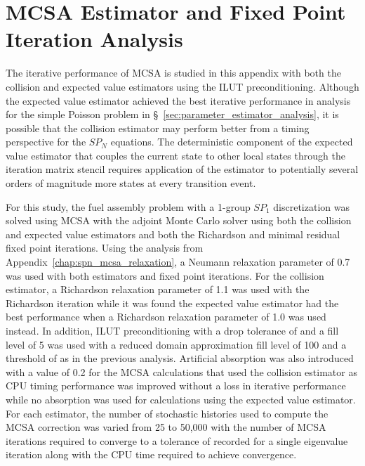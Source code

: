 \chapter{MCSA Estimator and Fixed Point\\ Iteration Analysis\ }
\label{chap:spn_estimator_comparison}
The iterative performance of MCSA is studied in this appendix with
both the collision and expected value estimators using the ILUT
preconditioning. Although the expected value estimator achieved the
best iterative performance in analysis for the simple Poisson problem
in \S~\ref{sec:parameter_estimator_analysis}, it is possible that the
collision estimator may perform better from a timing perspective for
the $SP_N$ equations. The deterministic component of the expected
value estimator that couples the current state to other local states
through the iteration matrix stencil requires application of the
estimator to potentially several orders of magnitude more states at
every transition event.

For this study, the fuel assembly problem with a 1-group $SP_1$
discretization was solved using MCSA with the adjoint Monte Carlo
solver using both the collision and expected value estimators and both
the Richardson and minimal residual fixed point iterations. Using the
analysis from Appendix~\ref{chap:spn_mcsa_relaxation}, a Neumann
relaxation parameter of 0.7 was used with both estimators and fixed
point iterations. For the collision estimator, a Richardson relaxation
parameter of 1.1 was used with the Richardson iteration while it was
found the expected value estimator had the best performance when a
Richardson relaxation parameter of 1.0 was used instead. In addition,
ILUT preconditioning with a drop tolerance of  and a fill
level of 5 was used with a reduced domain approximation fill level of
100 and a threshold of  as in the previous
analysis. Artificial absorption was also introduced with a value of
0.2 for the MCSA calculations that used the collision estimator as CPU
timing performance was improved without a loss in iterative
performance while no absorption was used for calculations using the
expected value estimator. For each estimator, the number of stochastic
histories used to compute the MCSA correction was varied from 25 to
50,000 with the number of MCSA iterations required to converge to a
tolerance of  recorded for a single eigenvalue iteration
along with the CPU time required to achieve convergence.


